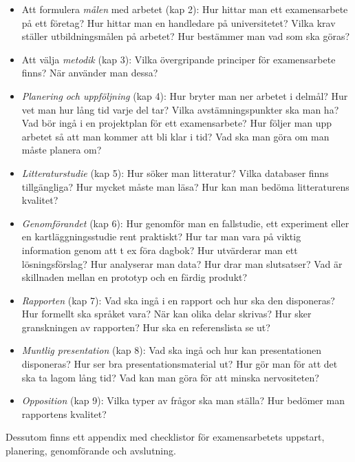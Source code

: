 \begin{itemize}
\item
  Att formulera \emph{målen} med arbetet (kap 2): Hur hittar man ett
  examensarbete på ett företag? Hur hittar man en handledare på
  universitetet? Vilka krav ställer utbildningsmålen på arbetet? Hur
  bestämmer man vad som ska göras?
\item
  Att välja \emph{metodik} (kap 3): Vilka övergripande principer för
  examensarbete finns? När använder man dessa?
\item
  \emph{Planering och uppföljning} (kap 4): Hur bryter man ner arbetet i
  delmål? Hur vet man hur lång tid varje del tar? Vilka
  avstämningspunkter ska man ha? Vad bör ingå i en projektplan för ett
  examensarbete? Hur följer man upp arbetet så att man kommer att bli
  klar i tid? Vad ska man göra om man måste planera om?
\item
  \emph{Litteraturstudie} (kap 5): Hur söker man litteratur? Vilka
  databaser finns tillgängliga? Hur mycket måste man läsa? Hur kan man
  bedöma litteraturens kvalitet?
\item
  \emph{Genomförandet} (kap 6): Hur genomför man en fallstudie, ett
  experiment eller en kartläggningsstudie rent praktiskt? Hur tar man
  vara på viktig information genom att t ex föra dagbok? Hur utvärderar
  man ett lösningsförslag? Hur analyserar man data? Hur drar man
  slutsatser? Vad är skillnaden mellan en prototyp och en färdig
  produkt?
\item
  \emph{Rapporten} (kap 7): Vad ska ingå i en rapport och hur ska den
  disponeras? Hur formellt ska språket vara? När kan olika delar
  skrivas? Hur sker granskningen av rapporten? Hur ska en referenslista
  se ut?
\item
  \emph{Muntlig presentation} (kap 8): Vad ska ingå och hur kan
  presentationen disponeras? Hur ser bra presentationsmaterial ut? Hur
  gör man för att det ska ta lagom lång tid? Vad kan man göra för att
  minska nervositeten?
\item
  \emph{Opposition} (kap 9): Vilka typer av frågor ska man ställa? Hur
  bedömer man rapportens kvalitet?
\end{itemize}

Dessutom finns ett appendix med checklistor för examensarbetets
uppstart, planering, genomförande och avslutning.
